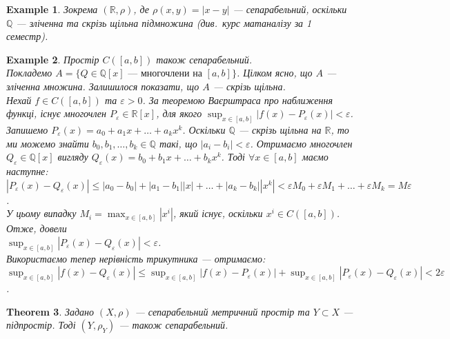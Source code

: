 \documentclass[a4paper, 10pt]{article}
\theoremstyle{theoremdd}
\newtheorem{theorem}{Theorem}[subsection]
\theoremstyle{theoremdd}
\theoremstyle{theoremdd}
\theoremstyle{theoremdd}
\newtheorem{example}[theorem]{Example}
\theoremstyle{theoremdd}
\theoremstyle{theoremdd}
\theoremstyle{theoremdd}
\theoremstyle{theoremdd}
\begin{document}
\begin{example}
Зокрема $(\mathbb{R}, \rho)$, де $\rho(x,y) = |x-y|$ --- сепарабельний, оскільки $\mathbb{Q}$ --- зліченна та скрізь щільна підмножина (див.\ курс матаналізу за 1 семестр).
\end{example}

\begin{example}
Простір $C([a,b])$ також сепарабельний.\\
Покладемо $A = \{ Q \in \mathbb{Q}[x] \text{ --- многочлени на $[a,b]$}\}$. Цілком ясно, що $A$ --- зліченна множина. Залишилося показати, що $A$ --- скрізь щільна.\\
Нехай $f \in C([a,b])$ та $\varepsilon > 0$. За теоремою Ваєрштраса про наближення функці, існує многочлен $P_\varepsilon \in \mathbb{R}[x]$, для якого $\displaystyle\sup_{x \in [a,b]} |f(x) - P_\varepsilon(x)| < \varepsilon$. Запишемо $P_\varepsilon(x) = a_0 + a_1 x + \dots + a_k x^k$. Оскільки $\mathbb{Q}$ --- скрізь щільна на $\mathbb{R}$, то ми можемо знайти $b_0,b_1,\dots,b_k \in \mathbb{Q}$ такі, що $|a_i-b_i| < \varepsilon$. Отримаємо многочлен $Q_\varepsilon \in \mathbb{Q}[x]$ вигляду $Q_\varepsilon(x) = b_0 + b_1 x + \dots + b_k x^k$. Тоді $\forall x \in [a,b]$ маємо наступне:\\
$|P_\varepsilon(x) - Q_\varepsilon(x)| \leq |a_0-b_0| + |a_1-b_1| |x| + \dots + |a_k - b_k| |x^k| < \varepsilon M_0 + \varepsilon M_1 + \dots + \varepsilon M_k = M \varepsilon$.\\
У цьому випадку $M_i = \displaystyle\max_{x \in [a,b]} |x^i|$, який існує, оскільки $x^i \in C([a,b])$. Отже, довели\\
$\displaystyle\sup_{x \in [a,b]} |P_\varepsilon(x) - Q_\varepsilon(x)| < \varepsilon$.\\
Використаємо тепер нерівність трикутника --- отримаємо:\\
$\displaystyle\sup_{x \in [a,b]} |f(x) - Q_\varepsilon(x)| \leq \sup_{x \in [a,b]} |f(x) - P_\varepsilon(x)| + \sup_{x \in [a,b]} |P_\varepsilon(x) - Q_\varepsilon(x)| < 2\varepsilon$.
\end{example}

\begin{theorem}
Задано $(X,\rho)$ --- сепарабельний метричний простір та $Y \subset X$ --- підпростір. Тоді $(Y,\rho_Y)$ --- також сепарабельний.
\end{theorem}
\end{document}
